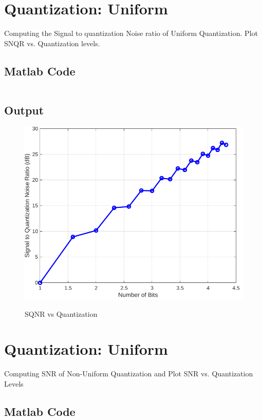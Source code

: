 \section{Quantization: Uniform}
\label{sec:Quantization: Uniform}

Computing the Signal to quantization Noise ratio of Uniform Quantization. 
Plot SNQR vs. Quantization levels.

\subsection{Matlab Code}

\inputminted[fontsize=\footnotesize,autogobble]{matlab}{code/sqnr.m}
\subsection{Output}

\begin{figure}[!htb]
	\centering
	\includegraphics[width=6in]{res/figures/Figure_3.pdf}
	\label{output:SQNR vs quantization}
	\caption{SQNR vs Quantization}
\end{figure}

\section{Quantization: Uniform}
\label{sec:Quantization: Non-Uniform}

Computing SNR of Non-Uniform Quantization and Plot SNR vs. Quantization Levels

\subsection{Matlab Code}

